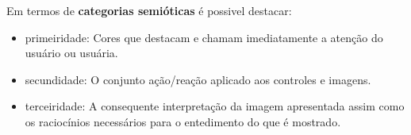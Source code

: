 \begin{frame}[allowframebreaks]
	\par Em termos de \textbf{categorias semióticas} \cite{santaella2017semiotica} é possivel destacar:
	\begin{itemize}
		\item primeiridade: Cores que destacam e chamam imediatamente a atenção do usuário ou usuária.
		\item secundidade: O conjunto ação/reação aplicado aos controles e imagens.
		\item terceiridade: A consequente interpretação da imagem apresentada assim como os raciocínios necessários para o entedimento do que é mostrado.
	\end{itemize}

\end{frame}